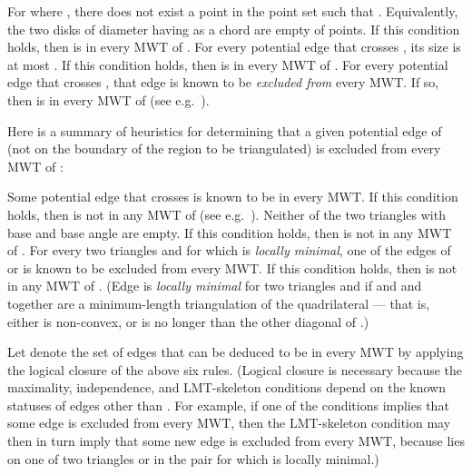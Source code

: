 \documentclass[final]{siamltex}
\begin{document}
\begin{description}
  {
    For  where ,
    there does not exist a point 
    in the point set such that .
    Equivalently, 
    the two disks of diameter  having  as a chord are empty
    of points.
    If this condition holds, then  is in every MWT of 
    \cite{keil1994computing,cheng1996approaching}.
  }
  {
For every potential edge  that crosses ,
    its size  is at most .
    If this condition holds, then  is in every MWT of 
    \cite{yang1994chain,gilbert1979new}.
  }
  {
    For every potential edge that crosses , that edge is known to be {\em excluded from} every MWT.
    If so, then  is in every MWT of 
    (see e.g.~\cite{dickerson1997large}).
  }
\end{description}
\smallskip

Here is a summary of heuristics for determining that 
a given potential edge  of  
(not on the boundary of the region to be triangulated) 
is excluded from every MWT of :

\begin{description}
  {
  Some potential edge that crosses  is known to be in every MWT.
  If this condition holds, then  is not in any MWT of 
  (see e.g.~\cite{dickerson1997large}).
  }
  {
  Neither of the two triangles with base  and base angle  are empty.
  If this condition holds, then  is not in any MWT of 
  \cite{das1989triangulations,drysdale2001exclusion}.
  }
  {
    For every two triangles  and  for which  is {\em locally minimal},
    one of the edges of  or  is known to be excluded from every MWT.
    If this condition holds, then  is not in any MWT of 
    \cite{dickerson1997large}.
    (Edge  is {\em locally minimal} 
    for two triangles  and 
    if  and
     and  together are a minimum-length triangulation of 
the quadrilateral  ---
    that is, either  is non-convex,
    or  is no longer than the other diagonal of .)
  }
\end{description}
\smallskip

\noindent
Let  denote the set of edges that can be deduced to be in every MWT
by applying the logical closure of the above six rules.
(Logical closure is necessary because the maximality, independence, and LMT-skeleton conditions
depend on the known statuses of edges other than .
For example, if one of the conditions implies that some edge  is excluded from every MWT,
then the LMT-skeleton condition may then in turn 
imply that some new edge  is excluded from every MWT,
because  lies on one of two triangles  or  in the pair for which  is locally minimal.)
\end{document}
